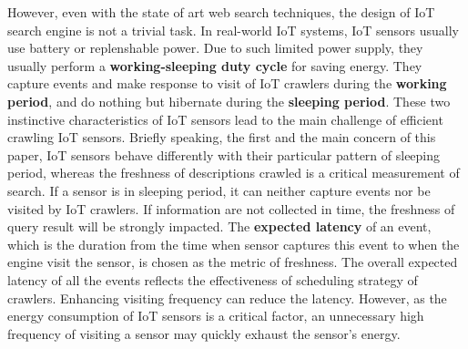 \documentclass[conference]{IEEEtran}
\begin{document}
However, even with the state of art web search techniques, the design of IoT search engine is not a trivial task. 
In real-world IoT systems, IoT sensors usually use battery or replenshable power. Due to such limited power supply, they usually perform a \textbf{working-sleeping duty cycle} for saving energy. They capture events and make response to visit of IoT crawlers during the \textbf{working period}, and do nothing but hibernate during the \textbf{sleeping period}.
These two instinctive characteristics of IoT sensors lead to the main challenge of efficient crawling IoT sensors. 
Briefly speaking, the first and the main concern of this paper, IoT sensors behave differently with their particular pattern of sleeping period, whereas the freshness of descriptions crawled is a critical measurement of search. 
If a sensor is in sleeping period, it can neither capture events nor be visited by IoT crawlers. 
If information are not collected in time, the freshness of query result will be strongly impacted.
The \textbf{expected latency} of an event, which is the duration from the time when sensor captures this event to when the engine visit the sensor, is chosen as the metric of freshness.
The overall expected latency of all the events reflects the effectiveness of scheduling strategy of crawlers.
Enhancing visiting frequency can reduce the latency.
However, as the energy consumption of IoT sensors is a critical factor, an unnecessary high frequency of visiting a sensor may quickly exhaust the sensor's energy.
\end{document}
